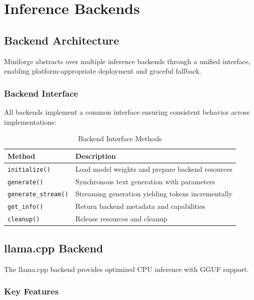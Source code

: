 \section{Inference Backends}
\label{sec:backends}

\subsection{Backend Architecture}

Miniforge abstracts over multiple inference backends through a unified interface, enabling platform-appropriate deployment and graceful fallback.

\subsubsection{Backend Interface}

All backends implement a common interface ensuring consistent behavior across implementations:

\begin{table}[h]
\centering
\caption{Backend Interface Methods}
\label{tab:backend_interface}
\begin{tabular}{lp{7cm}}
\toprule
\textbf{Method} & \textbf{Description} \\
\midrule
\texttt{initialize()} & Load model weights and prepare backend resources \\
\texttt{generate()} & Synchronous text generation with parameters \\
\texttt{generate\_stream()} & Streaming generation yielding tokens incrementally \\
\texttt{get\_info()} & Return backend metadata and capabilities \\
\texttt{cleanup()} & Release resources and cleanup \\
\bottomrule
\end{tabular}
\end{table}

\subsection{llama.cpp Backend}

The llama.cpp backend provides optimized CPU inference with GGUF support.

\subsubsection{Key Features}

